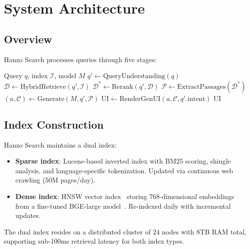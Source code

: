 \documentclass[11pt,twocolumn]{article}
\begin{document}
\section{System Architecture}
\label{sec:architecture}

\subsection{Overview}

Hanzo Search processes queries through five stages:

\begin{algorithm}[H]
\caption{Hanzo Search Pipeline}
\label{alg:pipeline}
\begin{algorithmic}[1]
\Require Query $q$, index $\mathcal{I}$, model $M$
\State $q' \gets \text{QueryUnderstanding}(q)$ 
\State $\mathcal{D} \gets \text{HybridRetrieve}(q', \mathcal{I})$ 
\State $\mathcal{D}^* \gets \text{Rerank}(q', \mathcal{D})$ 
\State $\mathcal{P} \gets \text{ExtractPassages}(\mathcal{D}^*)$ 
\State $(a, \mathcal{C}) \gets \text{Generate}(M, q', \mathcal{P})$ 
\State $\text{UI} \gets \text{RenderGenUI}(a, \mathcal{C}, q'.\text{intent})$
\State \Return $\text{UI}$
\end{algorithmic}
\end{algorithm}

\subsection{Index Construction}

Hanzo Search maintains a dual index:

\begin{itemize}[leftmargin=1.1em]
    \item \textbf{Sparse index}: Lucene-based inverted index with BM25 scoring, shingle analysis, and language-specific tokenization. Updated via continuous web crawling (50M pages/day).
    \item \textbf{Dense index}: HNSW vector index~\cite{malkov2018efficient} storing 768-dimensional embeddings from a fine-tuned BGE-large model~\cite{xiao2023bge}. Re-indexed daily with incremental updates.
\end{itemize}

The dual index resides on a distributed cluster of 24 nodes with 8TB RAM total, supporting sub-100ms retrieval latency for both index types.
\end{document}
